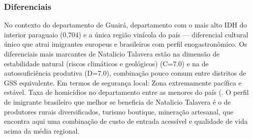 \subsubsection*{Diferenciais}\label{dif-natalicio-talavera-0412}
No contexto do departamento de Guairá, departamento com o mais alto IDH do interior paraguaio (0,704) e a única região vinícola do país — diferencial cultural único que atrai imigrantes europeus e brasileiros com perfil enogastronômico. Os diferenciais mais marcantes de Natalicio Talavera estão na dimensão de estabilidade natural (riscos climáticos e geológicos) (C=7.0) e na de autossuficiência produtiva (D=7.0), combinação pouco comum entre distritos de GSS equivalente. Em termos de segurança local: Zona extremamente pacífica e estável. Taxa de homicídios no departamento entre as menores do país (. O perfil de imigrante brasileiro que melhor se beneficia de Natalicio Talavera é o de produtores rurais diversificados, turismo boutique, mineração artesanal, que encontra aqui uma combinação de custo de entrada acessível e qualidade de vida acima da média regional.

